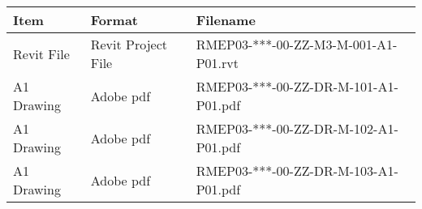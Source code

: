 \begin{tabular}{|l|l|l|}
	\hline
	\textbf{Item} & \textbf{Format} & \textbf{Filename} \\
	\hline
	Revit File  & Revit Project File & RMEP03-***-00-ZZ-M3-M-001-A1-P01.rvt \\
	A1 Drawing  & Adobe pdf & RMEP03-***-00-ZZ-DR-M-101-A1-P01.pdf  \\
	A1 Drawing  & Adobe pdf & RMEP03-***-00-ZZ-DR-M-102-A1-P01.pdf  \\
	A1 Drawing  & Adobe pdf & RMEP03-***-00-ZZ-DR-M-103-A1-P01.pdf  \\
	\hline
\end{tabular}

